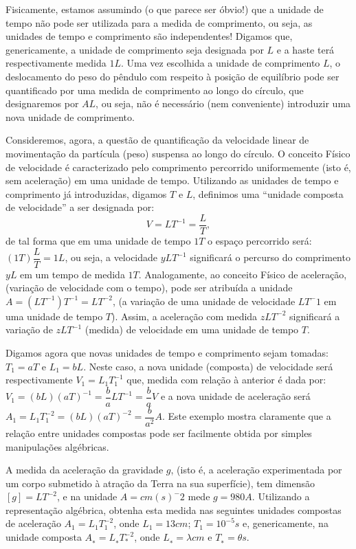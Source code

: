 Fisicamente, estamos assumindo (o que parece ser óbvio!) que a unidade de tempo não pode ser utilizada para a medida de comprimento, ou seja, as unidades de tempo e comprimento são independentes! Digamos que, genericamente, a unidade de comprimento seja designada por \(L\) e a haste terá respectivamente medida \(1 L\). Uma vez escolhida a unidade de comprimento \(L\), o deslocamento do peso do pêndulo com respeito à posição de equilíbrio pode ser quantificado por uma medida de comprimento ao longo do círculo, que designaremos por \(AL\), ou seja, não é necessário (nem conveniente) introduzir uma nova unidade de comprimento.

Consideremos, agora, a questão de quantificação da velocidade linear de movimentação da partícula (peso) suspensa ao longo do círculo. O conceito Físico de velocidade é caracterizado pelo comprimento percorrido uniformemente (isto é, sem aceleração) em uma unidade de tempo. Utilizando as unidades de tempo e comprimento já introduzidas, digamos \(T\) e \(L\), definimos uma ``unidade composta de velocidade'' a ser designada por:
\[V = LT^{-1} = \dfrac{L}{T},\]
de tal forma que em uma unidade de tempo \(1 T\) o espaço percorrido será:
\((1 T) \dfrac{L}{T} = 1 L\), ou seja, a velocidade \(y LT^{-1}\) significará o percurso do comprimento \(y L\) em um tempo de medida \(1 T\). Analogamente, ao conceito Físico de aceleração, (variação de velocidade com o tempo), pode ser atribuída a unidade \(A = (LT^{-1})T^{-1} = LT^{-2}\), (a variação de uma unidade de velocidade \(LT^-1\) em uma unidade de tempo \(T\)). Assim, a aceleração com medida \(z LT^{-2}\) significará a variação de \(z LT^{-1}\) (medida) de velocidade em uma unidade de tempo \(T\).

Digamos agora que novas unidades de tempo e comprimento sejam tomadas: \(T_1 = a T\) e \(L_1 = b L\). Neste caso, a nova unidade (composta) de velocidade será respectivamente \(V_1 = L_1T_1^{-1}\) que, medida com relação à anterior é dada por: \(V_1 = (bL)(aT)^{-1} = \dfrac{b}{a} LT^{-1} = \dfrac{b}{a} V\) e a nova unidade de aceleração será \(A_1 = L_1T_1^{-2} = (bL)(aT)^{-2} = \dfrac{b}{a^2} A\). Este exemplo mostra claramente que a relação entre unidades compostas pode ser facilmente obtida por simples manipulações algébricas.

\begin{exercise}
A medida da aceleração da gravidade \(g\), (isto é, a aceleração experimentada por um corpo submetido à atração da Terra na sua superfície), tem dimensão \([g] = LT^{-2}\), e na unidade \(A = cm(s)^-2\) mede \(g = 980A\). Utilizando a representação algébrica, obtenha esta medida nas seguintes unidades compostas de aceleração \(A_1 = L_1T_1^{-2}\), onde \(L_1 = 13 cm\); \(T_1 = 10^{-5} s\) e, genericamente, na unidade composta \(A_∗ = L_∗T_*^{-2}\), onde \(L_∗ = \lambda cm\) e \(T_∗ = \theta s\).
\end{exercise}

